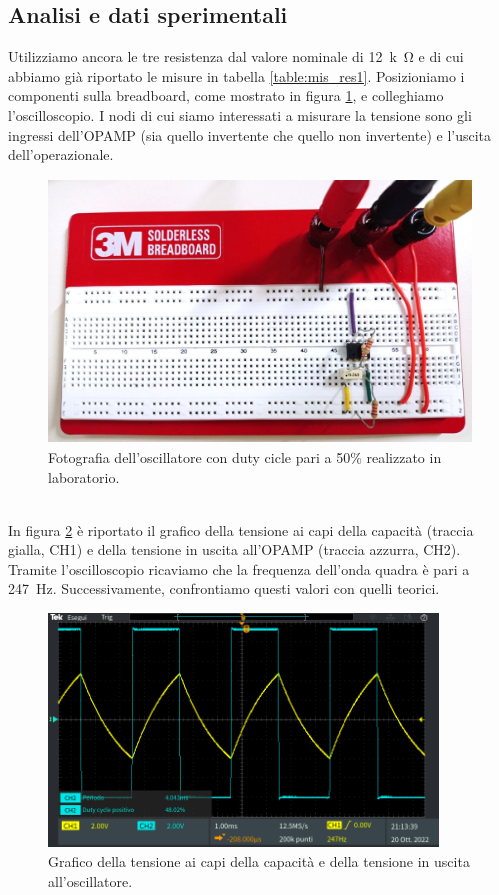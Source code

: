 \documentclass{report}
\begin{document}
\subsection{Analisi e dati sperimentali}
Utilizziamo ancora le tre resistenza dal valore nominale di \SI{12}{k\ohm} e di cui abbiamo già riportato le misure in tabella \ref{table:mis_res1}. Posizioniamo i componenti sulla breadboard, come mostrato in figura \ref{figura:circuito3}, e colleghiamo l'oscilloscopio. I nodi di cui siamo interessati a misurare la tensione sono gli ingressi dell'OPAMP (sia quello invertente che quello non invertente) e l'uscita dell'operazionale.
\begin{figure}[h!]
	\centering
	\includegraphics[height=7cm]{immagini/circuito3}
	\caption{Fotografia dell'oscillatore con duty cicle pari a 50\% realizzato in laboratorio.}
	\label{figura:circuito3}
\end{figure}
\\In figura \ref{figura:oscillo1} è riportato il grafico della tensione ai capi della capacità (traccia gialla, CH1) e della tensione in uscita all'OPAMP (traccia azzurra, CH2). Tramite l'oscilloscopio ricaviamo che la frequenza dell'onda quadra è pari a \SI{247}{\hertz}. Successivamente, confrontiamo questi valori con quelli teorici.
\begin{figure}[h!]
	\centering
	\includegraphics[height=6.2cm]{immagini/TEK00025}
	\caption{Grafico della tensione ai capi della capacità e della tensione in uscita all'oscillatore.}
	\label{figura:oscillo1}
\end{figure}
\end{document}
